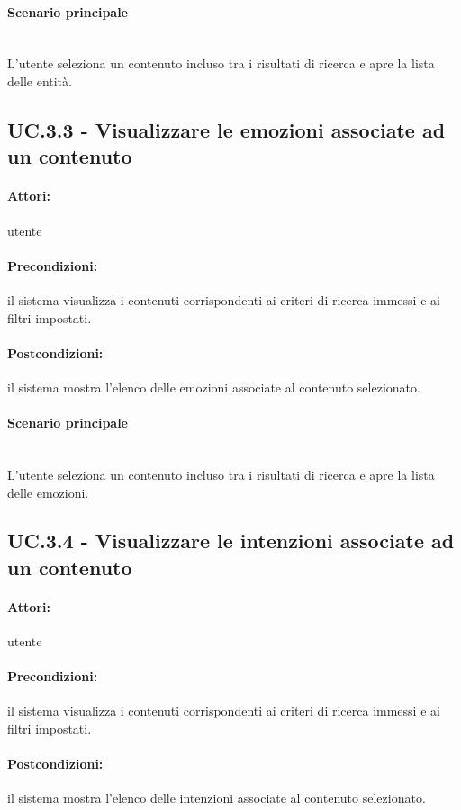 \documentclass[10pt,a4paper,headinclude,footinclude,hidelinks]{scrreprt} %
\begin{document}
	\paragraph{Scenario principale} \hfill \\
	L'utente seleziona un contenuto incluso tra i risultati di ricerca e apre la lista delle entità.

	\subsection[UC.3.3]{UC.3.3 - Visualizzare le emozioni associate ad un contenuto}
	\label{sec:stage:ar:uc:3_3}
	\paragraph{Attori:} utente
	\paragraph{Precondizioni:} il sistema visualizza i contenuti corrispondenti ai criteri di ricerca immessi e ai filtri impostati.
	\paragraph{Postcondizioni:} il sistema mostra l'elenco delle emozioni associate al contenuto selezionato.
	\paragraph{Scenario principale} \hfill \\
	L'utente seleziona un contenuto incluso tra i risultati di ricerca e apre la lista delle emozioni.

	\subsection[UC.3.4]{UC.3.4 - Visualizzare le intenzioni associate ad un contenuto}
	\label{sec:stage:ar:uc:3_4}
	\paragraph{Attori:} utente
	\paragraph{Precondizioni:} il sistema visualizza i contenuti corrispondenti ai criteri di ricerca immessi e ai filtri impostati.
	\paragraph{Postcondizioni:} il sistema mostra l'elenco delle intenzioni associate al contenuto selezionato.
\end{document}
